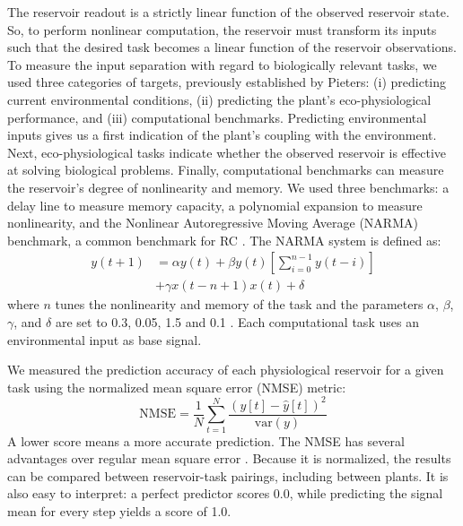 \documentclass[10pt,a4paper,journal]{IEEEtran}
\begin{document}
The reservoir readout is a strictly linear function of the observed reservoir state. 
So, to perform nonlinear computation, the reservoir must transform its inputs such that the desired task becomes a linear function of the reservoir observations.
To measure the input separation with regard to biologically relevant tasks, we used three categories of targets, previously established by Pieters: (i) predicting current environmental conditions, (ii) predicting the plant's eco-physiological performance, and (iii) computational benchmarks.
Predicting environmental inputs gives us a first indication of the plant's coupling with the environment.
Next, eco-physiological tasks indicate whether the observed reservoir is effective at solving biological problems.
Finally, computational benchmarks can measure the reservoir's degree of nonlinearity and memory.
We used three benchmarks: a delay line to measure memory capacity, a polynomial expansion to measure nonlinearity, and the Nonlinear Autoregressive Moving Average (NARMA) benchmark, a common benchmark for RC \cite{nakajima_information_2015}. 
The NARMA system is defined as:
\begin{equation} \label{eq:narma}
\begin{split}
    y(t+1) & = \alpha y(t) + \beta y(t) \left[ \sum_{i=0}^{n-1} y(t-i) \right] \\ 
    & + \gamma x(t-n+1) x(t) + \delta
\end{split}
\end{equation}
where $n$ tunes the nonlinearity and memory of the task and the parameters $\alpha$, $\beta$, $\gamma$, and $\delta$ are set to 0.3, 0.05, 1.5 and 0.1 \cite{nakajima_information_2015}.
Each computational task uses an environmental input as base signal.

We measured the prediction accuracy of each physiological reservoir for a given task using the normalized mean square error (NMSE) metric:
\begin{equation} \label{eq:nmse}
\text{NMSE} = \frac{1}{N} \sum_{t=1}^{N} \frac{\left(y[t] - \hat{y}[t]\right)^{2}}{\text{var}(y)} 
\end{equation}
A lower score means a more accurate prediction.
The NMSE has several advantages over regular mean square error \cite{pieters_reservoir_2022}.
Because it is normalized, the results can be compared between reservoir-task pairings, including between plants.
It is also easy to interpret: a perfect predictor scores 0.0, while predicting the signal mean for every step yields a score of 1.0.
\end{document}
